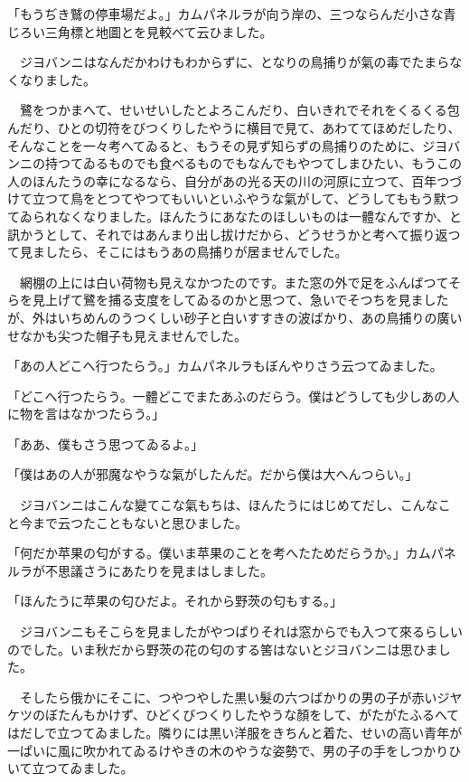 \documentclass[tate,paper=b6j,jafontsize=9pt]{jlreq}
\begin{document}
「もうぢき鷲の停車場だよ。」カムパネルラが向う岸の、三つならんだ小さな青じろい三角標と地圖とを見較べて云ひました。

　ジヨバンニはなんだかわけもわからずに、となりの鳥捕りが氣の毒でたまらなくなりました。

　鷺をつかまへて、せいせいしたとよろこんだり、白いきれでそれをくるくる包んだり、ひとの切符をびつくりしたやうに横目で見て、あわててほめだしたり、そんなことを一々考へてゐると、もうその見ず知らずの鳥捕りのために、ジヨバンニの持つてゐるものでも食べるものでもなんでもやつてしまひたい、もうこの人のほんたうの幸になるなら、自分があの光る天の川の河原に立つて、百年つづけて立つて鳥をとつてやつてもいいといふやうな氣がして、どうしてももう默つてゐられなくなりました。ほんたうにあなたのほしいものは一體なんですか、と訊かうとして、それではあんまり出し拔けだから、どうせうかと考へて振り返つて見ましたら、そこにはもうあの鳥捕りが居ませんでした。

　網棚の上には白い荷物も見えなかつたのです。また窓の外で足をふんばつてそらを見上げて鷺を捕る支度をしてゐるのかと思つて、急いでそつちを見ましたが、外はいちめんのうつくしい砂子と白いすすきの波ばかり、あの鳥捕りの廣いせなかも尖つた帽子も見えませんでした。

「あの人どこへ行つたらう。」カムパネルラもぼんやりさう云つてゐました。

「どこへ行つたらう。一體どこでまたあふのだらう。僕はどうしても少しあの人に物を言はなかつたらう。」

「ああ、僕もさう思つてゐるよ。」

「僕はあの人が邪魔なやうな氣がしたんだ。だから僕は大へんつらい。」

　ジヨバンニはこんな變てこな氣もちは、ほんたうにはじめてだし、こんなこと今まで云つたこともないと思ひました。


「何だか苹果の匂がする。僕いま苹果のことを考へたためだらうか。」カムパネルラが不思議さうにあたりを見まはしました。

「ほんたうに苹果の匂ひだよ。それから野茨の匂もする。」

　ジヨバンニもそこらを見ましたがやつぱりそれは窓からでも入つて來るらしいのでした。いま秋だから野茨の花の匂のする筈はないとジヨバンニは思ひました。

　そしたら俄かにそこに、つやつやした黒い髮の六つばかりの男の子が赤いジヤケツのぼたんもかけず、ひどくびつくりしたやうな顏をして、がたがたふるへてはだしで立つてゐました。隣りには黒い洋服をきちんと着た、せいの高い青年が一ぱいに風に吹かれてゐるけやきの木のやうな姿勢で、男の子の手をしつかりひいて立つてゐました。
\end{document}
